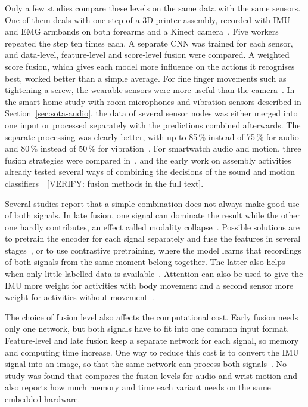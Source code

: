 Only a few studies compare these levels on the same data with the same sensors.
One of them deals with one step of a 3D printer assembly, recorded with IMU and
EMG armbands on both forearms and a Kinect camera~\cite{alamin2019action}. Five
workers repeated the
step ten times each. A separate CNN was trained for each sensor, and
data-level, feature-level and score-level fusion were compared. A weighted
score fusion, which gives each model more influence on the actions it
recognises best, worked better than a simple average. For fine finger movements
such as tightening a screw, the wearable sensors were more useful than the
camera~\cite{alamin2019action}. In the smart home study with room microphones and
vibration sensors described in Section~\ref{sec:sota-audio}, the data of several
sensor nodes was either merged into one input or processed
separately with the predictions combined afterwards. The separate processing
was clearly better, with up to 85\,\% instead of 75\,\% for audio and 80\,\%
instead of 50\,\% for vibration~\cite{koch2024recognition}. For smartwatch
audio and motion, three fusion strategies were compared
in~\cite{bhattacharya2022leveraging}, and the early work on assembly activities
already tested several ways of combining the decisions of the sound and motion
classifiers~\cite{ward2006activity}~[VERIFY: fusion methods in the full text].

Several studies report that a simple combination does not always make good use
of both signals. In late fusion, one signal can dominate the result while the
other one hardly contributes, an effect called modality
collapse~\cite{bonyani2026multimodal}. Possible solutions are to pretrain the
encoder for each signal separately and fuse the features in several
stages~\cite{choi2022multistage}, or to use contrastive pretraining, where the
model learns that recordings of both signals from the same moment belong
together. The latter also helps when only little labelled data is
available~\cite{ouyang2022cosmo}. Attention can also be used to give the IMU
more weight for activities with body movement and a second sensor more weight
for activities without movement~\cite{nakabayashi2024multimodal}.

The choice of fusion level also affects the computational cost. Early fusion
needs only one network, but both signals have to fit into one common input
format. Feature-level and late fusion keep a separate network for each signal,
so memory and computing time increase. One way to reduce this cost is to
convert the IMU signal into an image, so that the same network can process
both signals~\cite{gao2023mmtsa}. No study was found that compares the fusion
levels for audio and wrist motion and also reports how much memory and time
each variant needs on the same embedded hardware.

